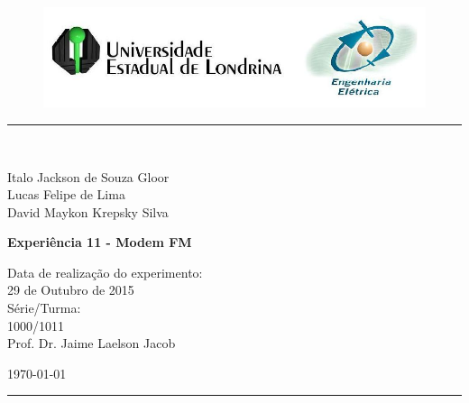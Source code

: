 \begin{titlepage}
\begin{center}
\begin{figure}[h]
\includegraphics[scale=0.76]{imagem/topdotitulo.png}
\end{figure}
\rule{\columnwidth}{1.5mm}
\

\large Italo Jackson de Souza Gloor\\
\large Lucas Felipe de Lima \\
\large David Maykon Krepsky Silva

\vspace{4cm}
{\bf \Large Experiência 11 - Modem FM}
\vspace{3.5cm}

\begin{flushright}
Data de realização do experimento:\\
29 de Outubro de 2015\\
Série/Turma:\\
1000/1011\\
Prof. Dr. Jaime Laelson Jacob 
\end{flushright}

\vspace{3.2cm}
\today

\rule{\columnwidth}{1.3mm}
\end{center}
\end{titlepage}